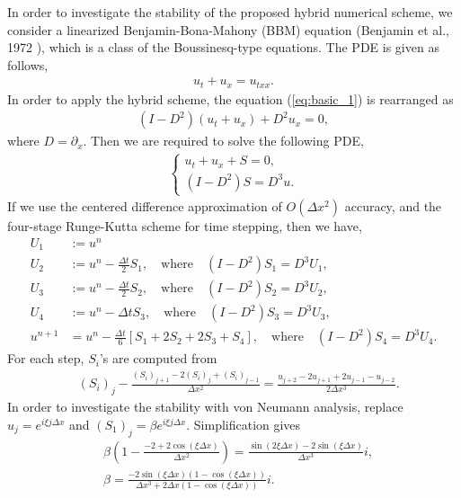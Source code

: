 \documentclass[review]{elsarticle}
\begin{document}
In order to investigate the stability of the proposed hybrid numerical scheme,
we consider a linearized Benjamin-Bona-Mahony (BBM)
equation (Benjamin et al., 1972 \cite{benjamin1972model}),
which is a class of the Boussinesq-type equations. 
The PDE is given as follows,
\begin{align}
u_t + u_x = u_{txx}.
\label{eq:basic_1}
\end{align}
In order to apply the hybrid scheme,
the equation (\ref{eq:basic_1}) is rearranged as
\begin{align}
(I-D^2)(u_t + u_x) +D^2u_x = 0, \label{eq:basic_2}
\end{align}
where $D=\partial_x$.
Then we are required to solve the following PDE,
\begin{align}
\left\{
\begin{array}{l}
u_t + u_x + S = 0, \\
\left(I-D^2 \right)S = D^3 u .
\end{array}
\right.
\end{align}
If we use the centered difference approximation of $O(\Delta x^2)$
accuracy, and the four-stage Runge-Kutta scheme for time stepping,
then we have,
\begin{align*}
U_1 &:= u^n \\
U_2 &:= u^n - \frac{\Delta t}{2}S_1, \quad  \textrm{where}\quad 
(I-D^2)S_1 = D^3 U_1, \\
U_3 &:= u^n - \frac{\Delta t}{2}S_2, \quad  \textrm{where}\quad
(I-D^2)S_2 = D^3 U_2, \\
U_4 &:= u^n - \Delta tS_3, \quad  \textrm{where}\quad
(I-D^2)S_3 = D^3 U_3, \\
u^{n+1} & = u^n -\frac{\Delta t}{6} \left[
S_1 + 2S_2 + 2S_3 + S_4
\right],  \quad  \textrm{where}\quad
(I-D^2)S_4 = D^3 U_4.
\end{align*}
For each step, $S_i$'s are computed from
\begin{align*}
& (S_i)_j - \frac{(S_i)_{j+1}-2(S_i)_j+(S_i)_{j-1}}{\Delta x^2} = 
\frac{u_{j+2} - 2u_{j+1} +2u_{j-1} -u_{j-2}}{2\Delta x^3}.
\end{align*}
In order to investigate the stability with von Neumann analysis,
replace $u_j= e^{i\xi j \Delta x}$ and  $(S_1)_j= \beta e^{i\xi j \Delta x}$. 
Simplification gives
\begin{align*}
&\beta \left( 1 - \frac{-2+2\cos(\xi \Delta x) }{\Delta x^2} \right) = 
\frac{\sin(2\xi \Delta x) - 2 \sin(\xi \Delta x)}{\Delta x^3} i, \\
& \beta = \frac{ -2\sin(\xi \Delta x)(1-  \cos(\xi \Delta x)) }
                     { \Delta x^3 +2\Delta x(1-\cos(\xi \Delta x))} i.
\end{align*}
\end{document}
